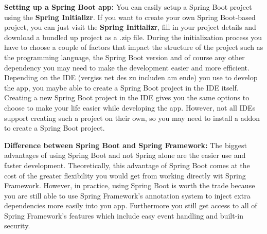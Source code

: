    \textbf{Setting up a Spring Boot app:} \newline
    You can easily setup a Spring Boot project using the \textbf{Spring Initializr}. If you want to create your own Spring Boot-based project, you can just visit the \textbf{Spring Initializr}, fill in your project details and download a bundled up project as a .zip file. During the initialization process you have to choose a couple of factors that impact the structure of the 
    project such as the programming language, the Spring Boot version and of course any other dependency you may need to make the development easier and more efficient.
    Depending on the IDE (vergiss net des zu includen am ende) you use to develop the app, you maybe able to create a Spring Boot project in the IDE itself. Creating a new Spring Boot project in the IDE gives you the same options to choose to make your life easier while developing the app. However, not all IDEs support creating such a project
    on their own, so you may need to install a addon to create a Spring Boot project.
    
    \textbf{Difference between Spring Boot and Spring Framework:} \newline
    The biggest advantages of using Spring Boot and not Spring alone are the easier use and faster development. Theoretically, this advantage of Spring Boot comes at the cost of the greater flexibility you would get from working directly wit Spring Framework. However, in practice, using Spring Boot is worth the trade because you are still able to use
    Spring Framework's annotation system to inject extra dependencies more easily into you app. Furthermore you still get access to all of Spring Framework's features which include easy event handling and built-in security. 
    

